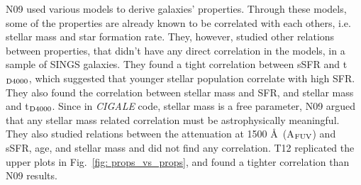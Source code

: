         N09 used various models to derive galaxies' properties.
        Through these models, some of the properties are already known to be correlated with each others, i.e. stellar mass and star formation rate.
        They, however, studied other relations between properties, that didn't have any direct correlation in the models, in a sample of SINGS galaxies. %
        They found a tight correlation between sSFR and t$_{\rm {D4000}}$, which suggested that younger stellar population correlate with high SFR.
        They also found the correlation between stellar mass and SFR, and stellar mass and t$_{\rm {D4000}}$.
        Since in {\em CIGALE} code, stellar mass is a free parameter, N09 argued that any stellar mass related correlation must be astrophysically meaningful. 
        They also studied relations between the attenuation at 1500 \AA~(A$_{\rm {FUV}}$) and sSFR, age, and stellar mass and did not find any correlation.
        T12 replicated the upper plots in Fig.~\ref{fig: props_vs_props}, and found a tighter correlation than N09 results. 
        
